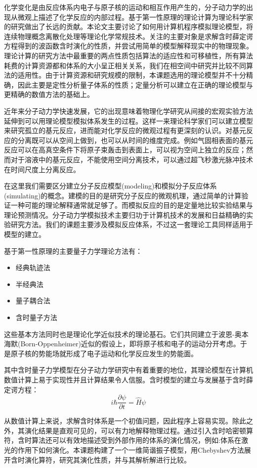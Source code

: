 
化学变化是由反应体系内电子与原子核的运动和相互作用产生的，分子动力学的出现从微观上描述了化学反应的内部过程。基于第一性原理的理论计算为理论科学家的研究做出了长远的贡献。本论文主要讨论了如何用计算机程序模拟理论模型，将连续物理概念离散化处理等理论化学常规技术。关注的主要对象是求解含时薛定谔方程得到的波函数含时演化的性质，并尝试用简单的模型解释现实中的物理现象。理论计算的研究方法中最重要的两点性质包括算法的适应性和可移植性，所有算法耗费的计算资源都和体系的大小呈正相关关系，我们在相空间中研究并比较不同算法的适用性。由于计算资源和研究规模的限制，本课题选用的理论模型并不十分精确，因此主要是定性分析量子体系的性质；定量分析可以建立在正确的理论模型与更精确的数值方法的基础上。

近年来分子动力学快速发展，它的出现意味着物理化学研究从间接的宏观实验方法延伸到可以用理论模型模拟体系发生的过程。这样一来理论科学家们可以建立模型来研究孤立的基元反应，进而能对化学反应的微观过程有更深刻的认识。对基元反应的分离既可以从空间上做到，也可以从时间的维度完成。例如气固相表面的基元反应可以在高真空条件下将原子束轰击到表面上，可以视为空间上独立的反应；然而对于溶液中的基元反应，不能使用空间分离技术，可以通过超飞秒激光脉冲技术在时间尺度上分离反应。

在这里我们需要区分建立分子反应模型(modeling)和模拟分子反应体系(simulating)的概念。建模的目的是研究分子反应的微观机理，通过简单的计算验证一种可能的理论解释通常就足够了。而模拟反应的目的是定量地比较实验结果与理论预测情况。分子动力学模拟技术主要归功于计算机技术的发展和日益精确的实验研究方法。我们的课题主要涉及模拟反应体系，不过这一套理论工具同样适用于模型的建立。

基于第一性原理的主要量子力学理论方法有：
\begin{multicols}{2}
\begin{itemize}
  \item 经典轨迹法
  \item 半经典法
  \item 量子耦合法
  \item 含时量子方法
\end{itemize}
\end{multicols}
这些基本方法同时也是理论化学近似技术的理论基石。它们共同建立于波恩-奥本海默(Born-Oppenheimer)近似的假设上，即将原子核和电子的运动分开考虑。于是原子核的势能场就形成了电子运动和化学反应发生的势能面。




其中含时量子力学模型在分子动力学研究中有着重要的地位，其理论模型在计算机数值计算上易于实现性并且计算结果令人信服。含时模型的建立与发展基于含时薛定谔方程：
\begin{equation}
  i \hbar \frac{\partial \psi}{\partial t} = \hat{H} \psi  
\end{equation} 

从数值计算上来说，求解含时体系是一个初值问题，因此程序上容易实现。除此之外，其演化结果是直观可见的，可以有力地解释物理过程。通过引入含时哈密顿算符，含时算法还可以有效地描述受到外部作用的体系的演化情况，例如:体系在激光的作用下如何演化。本课题构建了一个一维简谐振子模型，用Chebyshev方法展开含时演化算符，研究其演化性质，并与其解析解进行比较。